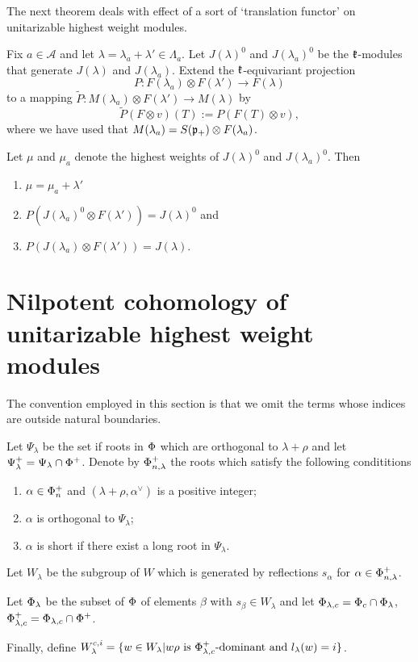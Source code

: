 The next theorem  deals with effect of a sort of `translation functor' on unitarizable highest weight modules.
\begin{theorem}
 Fix $a\in\mathcal{A}$ and let $\lambda = \lambda_a + \lambda'\in\Lambda_a$. Let $J(\lambda)^0$ and $J(\lambda_a)^0$ be the $\mathfrak{k}$-modules that generate $J(\lambda)$ and $J(\lambda_a)$. Extend the $\mathfrak{k}$-equivariant projection \[P:F(\lambda_a)\otimes F(\lambda') \to F(\lambda)\] to a mapping $\widetilde{P}:M(\lambda_a) \otimes F(\lambda') \to M(\lambda)$ by \[\widetilde{P}(F\otimes v) (T) := P(F(T)\otimes v),\]
  where we have used that $M(\lambda_a) = S(\mathfrak{p}_+)\otimes F(\lambda_a)$.

Let $\mu$ and $\mu_a$ denote the highest weights of  $J(\lambda)^0$ and $J(\lambda_a)^0$. Then
 \begin{enumerate}
  \item $\mu  = \mu_a+\lambda'$
  \item $P(J(\lambda_a)^0\otimes F(\lambda')) = J(\lambda)^0$ and 
  \item $P(J(\lambda_a)\otimes F(\lambda')) = J(\lambda)$.
 \end{enumerate}
\end{theorem}

\section{Nilpotent cohomology of unitarizable highest weight modules}

The convention employed in this section is that we omit the terms whose indices are outside natural boundaries. 

\begin{definition}\label{def:cohomology_roots}
Let $\Psi_\lambda$ be the set if roots in $\Phi$ which are orthogonal to $\lambda+\rho$ and let $\Psi_\lambda^+ = \Psi_\lambda \cap \Phi^+$. Denote by $\Phi_{n,\lambda}^+$ the roots which satisfy the following condititions
 \begin{enumerate}
    \item $\alpha \in \Phi_n^+$ and $(\lambda+\rho,\alpha^\vee)$ is a positive integer;
    \item $\alpha$ is orthogonal to $\Psi_\lambda$;
    \item $\alpha$ is short if there exist a long root in $\Psi_\lambda$.
 \end{enumerate}
 
 Let $W_\lambda$ be the subgroup of $W$ which is generated by reflections $s_\alpha$ for $\alpha\in \Phi_{n,\lambda}^+$.
 
 Let $\Phi_\lambda$ be the subset of $\Phi$ of elements $\beta$ with $s_\beta\in W_\lambda$ and let $\Phi_{\lambda,c} = \Phi_c \cap \Phi_\lambda$, $\Phi_{\lambda,c}^+ = \Phi_{\lambda,c} \cap \Phi^+$.
 
 Finally, define  $W^{c,i}_\lambda = \{ w \in W_\lambda | w \rho \text{ is } \Phi^+_{\lambda, c}\text{-dominant and } l_\lambda(w)=i \}$.
\end{definition}


